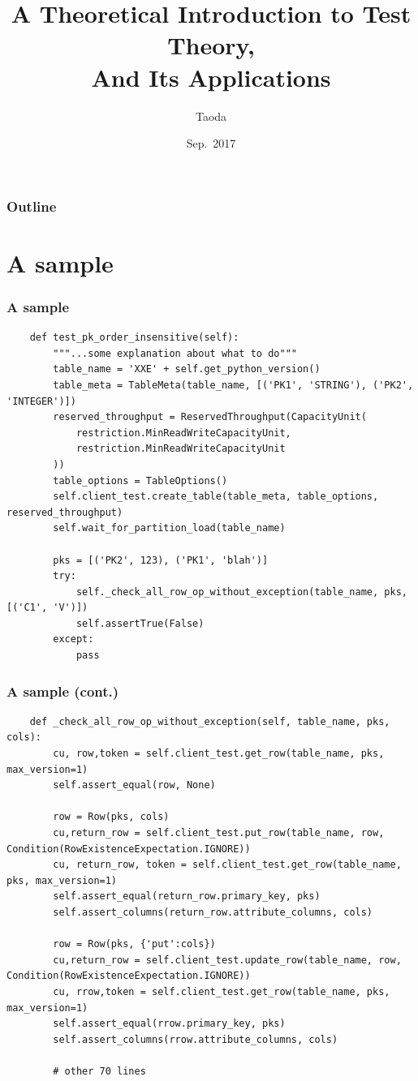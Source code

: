 \documentclass[lualatex]{beamer}
\title[Theoretical Test Theory]{A Theoretical Introduction to Test Theory,\\And Its Applications}
\author{Taoda}
\institute{Alibaba Cloud}
\date{Sep.\ 2017}
\begin{document}
\begin{frame}
\titlepage
\end{frame}

\begin{frame}
  \frametitle{Outline}
  \tableofcontents
\end{frame}

\section{A sample}

\begin{frame}[fragile]
  \frametitle{A sample}

  \begin{verbatim}
    def test_pk_order_insensitive(self):
        """...some explanation about what to do"""
        table_name = 'XXE' + self.get_python_version()
        table_meta = TableMeta(table_name, [('PK1', 'STRING'), ('PK2', 'INTEGER')])
        reserved_throughput = ReservedThroughput(CapacityUnit(
            restriction.MinReadWriteCapacityUnit,
            restriction.MinReadWriteCapacityUnit
        ))
        table_options = TableOptions()
        self.client_test.create_table(table_meta, table_options, reserved_throughput)
        self.wait_for_partition_load(table_name)
 
        pks = [('PK2', 123), ('PK1', 'blah')]
        try:
            self._check_all_row_op_without_exception(table_name, pks, [('C1', 'V')])
            self.assertTrue(False)
        except:
            pass
  \end{verbatim}
\end{frame}

\begin{frame}[fragile]
  \frametitle{A sample (cont.)}

  \begin{verbatim}
    def _check_all_row_op_without_exception(self, table_name, pks, cols):
        cu, row,token = self.client_test.get_row(table_name, pks, max_version=1)
        self.assert_equal(row, None)
        
        row = Row(pks, cols)
        cu,return_row = self.client_test.put_row(table_name, row, Condition(RowExistenceExpectation.IGNORE))
        cu, return_row, token = self.client_test.get_row(table_name, pks, max_version=1)
        self.assert_equal(return_row.primary_key, pks)
        self.assert_columns(return_row.attribute_columns, cols)

        row = Row(pks, {'put':cols})
        cu,return_row = self.client_test.update_row(table_name, row, Condition(RowExistenceExpectation.IGNORE))
        cu, rrow,token = self.client_test.get_row(table_name, pks, max_version=1)
        self.assert_equal(rrow.primary_key, pks)
        self.assert_columns(rrow.attribute_columns, cols)

        # other 70 lines
  \end{verbatim}
\end{frame}
\end{document}

